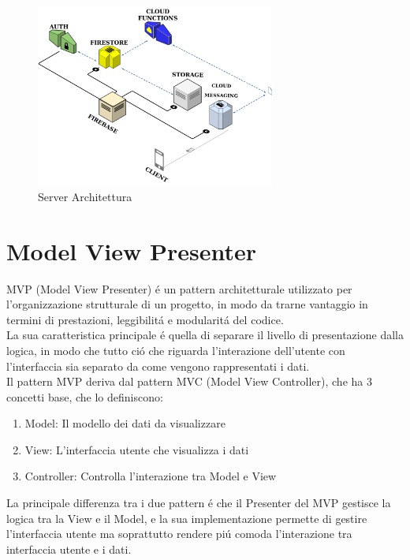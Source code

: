 \begin{figure}[!hb]
  \centering
  \includegraphics[width=0.7\textwidth]{immagini/server_arch.png}
  \caption{Server Architettura}\label{fig:Architettura Server}
\end{figure}


\section{Model View Presenter}                 %
MVP (Model View Presenter) \'e un pattern architetturale utilizzato per l'organizzazione strutturale di un progetto, in modo da trarne vantaggio in termini di prestazioni, leggibilit\'a e modularit\'a del codice.\\
La sua caratteristica principale \'e quella di separare il livello di presentazione dalla logica, in modo che tutto ci\'o che riguarda l'interazione dell'utente con l'interfaccia sia separato da come vengono rappresentati i dati.\\
Il pattern MVP deriva dal pattern MVC (Model View Controller), che ha 3 concetti base, che lo definiscono:

\begin{enumerate}
\item Model: Il modello dei dati da visualizzare
\item View: L'interfaccia utente che visualizza i dati
\item Controller: Controlla l'interazione tra Model e View
\end{enumerate}

La principale differenza tra i due pattern \'e che il Presenter del MVP gestisce la logica tra la View e il Model, e la sua implementazione permette di gestire l'interfaccia utente ma soprattutto rendere pi\'u comoda l'interazione tra interfaccia utente e i dati.\\


